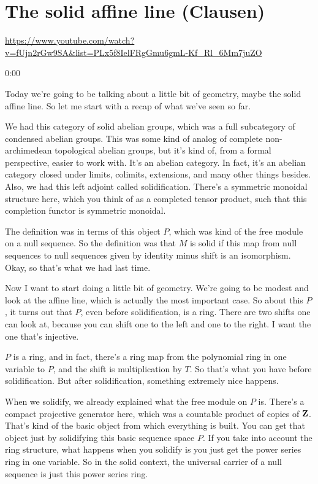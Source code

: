 
\section{\ufs The solid affine line (Clausen)}

\url{https://www.youtube.com/watch?v=fUjn2rGw9SA&list=PLx5f8IelFRgGmu6gmL-Kf_Rl_6Mm7juZO}
\renewcommand{\yt}[2]{\href{https://www.youtube.com/watch?v=fUjn2rGw9SA&list=PLx5f8IelFRgGmu6gmL-Kf_Rl_6Mm7juZO&t=#1}{#2}}
\vspace{1em}

\begin{unfinished}{0:00}

Today we're going to be talking about a little bit of geometry, maybe the solid affine line. So let me start with a recap of what we've seen so far.

We had this category of solid abelian groups, which was a full subcategory of condensed abelian groups. This was some kind of analog of complete non-archimedean topological abelian groups, but it's kind of, from a formal perspective, easier to work with. It's an abelian category. In fact, it's an abelian category closed under limits, colimits, extensions, and many other things besides. Also, we had this left adjoint called solidification. There's a symmetric monoidal structure here, which you think of as a completed tensor product, such that this completion functor is symmetric monoidal.

The definition was in terms of this object $P$, which was kind of the free module on a null sequence. So the definition was that $M$ is solid if this map from null sequences to null sequences given by identity minus shift is an isomorphism. Okay, so that's what we had last time.

Now I want to start doing a little bit of geometry. We're going to be modest and look at the affine line, which is actually the most important case. So about this $P$, it turns out that $P$, even before solidification, is a ring. There are two shifts one can look at, because you can shift one to the left and one to the right. I want the one that's injective.

$P$ is a ring, and in fact, there's a ring map from the polynomial ring in one variable to $P$, and the shift is multiplication by $T$. So that's what you have before solidification. But after solidification, something extremely nice happens.

When we solidify, we already explained what the free module on $P$ is. There's a compact projective generator here, which was a countable product of copies of $\mathbf Z$. That's kind of the basic object from which everything is built. You can get that object just by solidifying this basic sequence space $P$. If you take into account the ring structure, what happens when you solidify is you just get the power series ring in one variable. So in the solid context, the universal carrier of a null sequence is just this power series ring.


\end{unfinished}
